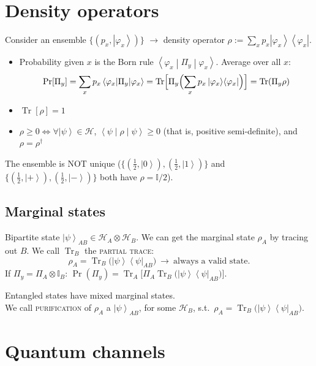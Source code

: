 \documentclass[11pt,a4paper]{article}
\renewcommand{\ket}[1]{\left|#1\right\rangle}
\newcommand{\ketbra}[2]{\left|#1\right\rangle\!\left\langle#2\right|}
\newcommand{\expval}[3]{\left\langle#1\middle|#2\middle|#3\right\rangle}
\newcommand{\Tr}{\operatorname{Tr}}
\newcommand{\Hil}{\mathcal{H}}
\newcommand{\id}{\mathbb{I}}
\begin{document}
\section{Density operators}

Consider an ensemble $\{(p_x,\ket{\varphi_x})\}$ $\to$ density operator $\rho := \sum_xp_x\ketbra{\varphi_x}{\varphi_x}$.
\begin{itemize}
  \item Probability given $x$ is the Born rule $\expval{\varphi_x}{\Pi_y}{\varphi_x}$. Average over all $x$:
  \[
  \Pr[\Pi_y] = \sum_xp_x\expval{\varphi_x}{\Pi_y}{\varphi_x} = \Tr\Bigl[\Pi_y\Bigl(\sum_xp_x\ketbra{\varphi_x}{\varphi_x}\Bigr)\Bigr] = \Tr(\Pi_y\rho)
  \]
  \item $\Tr[\rho] = 1$
  \item $\rho\ge0 \iff \forall\ket\psi\in\Hil$, $\expval\psi\rho\psi\ge0$ (that is, positive semi-definite), and $\rho = \rho^\dagger$
\end{itemize}
The ensemble is NOT unique ($\{(\frac12,\ket0),(\frac12,\ket1)\}$ and $\{(\frac12,\ket+),(\frac12,\ket-)\}$ both have $\rho = \id/2$).

\subsection{Marginal states}

Bipartite state $\ket\psi_{AB}\in\Hil_A\otimes\Hil_B$. We can get the marginal state $\rho_A$ by tracing out $B$. We call $\Tr_B$ the \textsc{partial trace}:
\[
\rho_A = \Tr_B\bigl(\ketbra\psi\psi_{AB}\bigr)\ \to\ \text{always a valid state.}
\]
If $\Pi_y = \Pi_A\otimes\id_B$: \quad $\Pr(\Pi_y) = \Tr_A\bigl[\Pi_A\Tr_B\bigl(\ketbra\psi\psi_{AB}\bigr)\bigr]$.

Entangled states have mixed marginal states.\\
We call \textsc{purification} of $\rho_A$ a $\ket\psi_{AB}$, for some $\Hil_B$, s.t.\ $\rho_A = \Tr_B\bigl(\ketbra\psi\psi_{AB}\bigr)$.

\section{Quantum channels}
\end{document}
